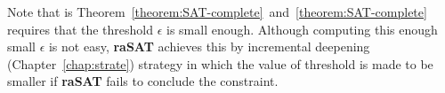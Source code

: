 Note that is Theorem~\ref{theorem:SAT-complete}~and~\ref{theorem:SAT-complete} requires that the threshold $\epsilon$ is small enough. Although computing this enough small $\epsilon$ is not easy, \textbf{raSAT} achieves this by incremental deepening (Chapter~\ref{chap:strate}) strategy in which the value of threshold is made to be smaller if \textbf{raSAT} fails to conclude the constraint.
\begin{comment}
\section{Over-Approximation Theory Refinement}
\label{sec:soundness}

From now on, We focus on a \emph{polynomial inequality} such that 
$I_i$ and $\psi_j(x_1,\cdots,x_n)$ are an open interval $(a_i,b_i)$ and 
an atomic polynomial inequaltiy (API) $f_j > 0$, respectively. 
We denote $\mathbb{S}(f_j) = \{x \in \Real^n \mid f_j > 0 ~\text{holds}\}$.

For ICP, it is folklore that, for polynomial inequality 
$\exists x_1 \in (a_1,b_1) \cdots x_n \in (a_n,b_n) . \wedge_{i} f_i > 0$, 
\begin{itemize}
\item if $\exists x_1 \in (a_1,b_1) \cdots x_n \in (a_n,b_n) . \wedge_{i} f_i > 0$ is SAT, 
ICP eventually detects it, and 
\item if $\exists x_1 \in [a_1,b_1] \cdots x_n \in [a_n,b_n] . \wedge_{i} f_i \geq 0$ is UNSAT, 
ICP eventually detects it, 
\end{itemize}
under the assumptions of {\em fair} decomposition and bounded intervals $(a_i,b_i)$. 
We will prepare terminology and briefly review this fact. 

\suppress{
\begin{definition} \label{def:poly}
A polynomial inequality is a bounded quantification 
$\exists x_1 \in I_1 \cdots x_n \in I_n. \psi(x_1,\cdots,x_n)$ 
such that 
\begin{itemize}
\item each $I_i$ is an open interval $x_i \in (a_i,b_i)$, and 
\item $\psi(x_1,\cdots,x_n)$ is a conjunction of $f_j > 0$ 
where $f_j$ is a polynomial over $\{x_1, \cdots, x_n\}$. 
\end{itemize}
$f_i > 0$ is called an atomic polynomial inequality (API). 
We denote $\mathbb{S}(F) = \{x \in \Real^n \mid F ~\text{holds}\}$.
\end{definition}


\end{comment}
